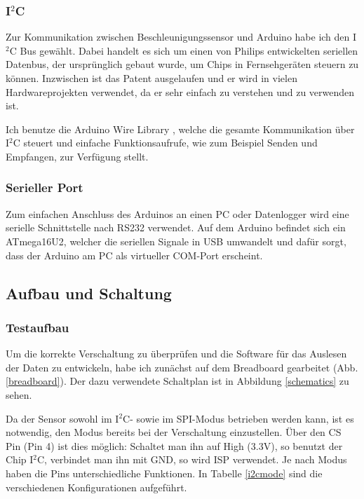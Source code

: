 \documentclass[12pt,a4paper,twoside,BCOR=12.5mm]{scrartcl}
\begin{document}
\subsubsection{I$^2$C}
Zur Kommunikation zwischen Beschleunigungssensor und Arduino habe ich den  I$^2$C Bus \citep{:2012fj} gewählt.
Dabei handelt es sich um einen von Philips entwickelten seriellen Datenbus, der ursprünglich gebaut wurde, um Chips in Fernsehgeräten steuern zu können. Inzwischen ist das Patent ausgelaufen und er wird in vielen Hardwareprojekten verwendet, da er sehr einfach zu verstehen und zu verwenden ist. 

Ich benutze die Arduino Wire Library \citep{:2012vn}, welche die gesamte Kommunikation über I$^2$C steuert und einfache Funktionsaufrufe, wie zum Beispiel Senden und Empfangen, zur Verfügung stellt.

\subsubsection{Serieller Port}
Zum einfachen Anschluss des Arduinos an einen PC oder Datenlogger wird eine serielle Schnittstelle nach RS232 verwendet. Auf dem Arduino befindet sich ein ATmega16U2, welcher die seriellen Signale in USB umwandelt und dafür sorgt, dass der Arduino am PC als virtueller COM-Port erscheint.

\newpage
\subsection{Aufbau und Schaltung}

\subsubsection{Testaufbau}

Um die korrekte Verschaltung zu überprüfen und die Software für das Auslesen der Daten zu entwickeln, habe ich zunächst auf dem Breadboard gearbeitet (Abb. \ref{breadboard}). Der dazu verwendete Schaltplan ist in Abbildung \ref{schematics} zu sehen.

Da der Sensor sowohl im I$^2$C- sowie im SPI-Modus betrieben werden kann, ist es notwendig, den Modus bereits bei der Verschaltung einzustellen. Über den CS Pin (Pin 4) ist dies möglich: Schaltet man ihn auf High (3.3V), so benutzt der Chip I$^2$C, verbindet man ihn mit GND, so wird ISP verwendet. Je nach Modus haben die Pins unterschiedliche Funktionen. In Tabelle \ref{i2cmode} sind die verschiedenen Konfigurationen aufgeführt.
\end{document}
